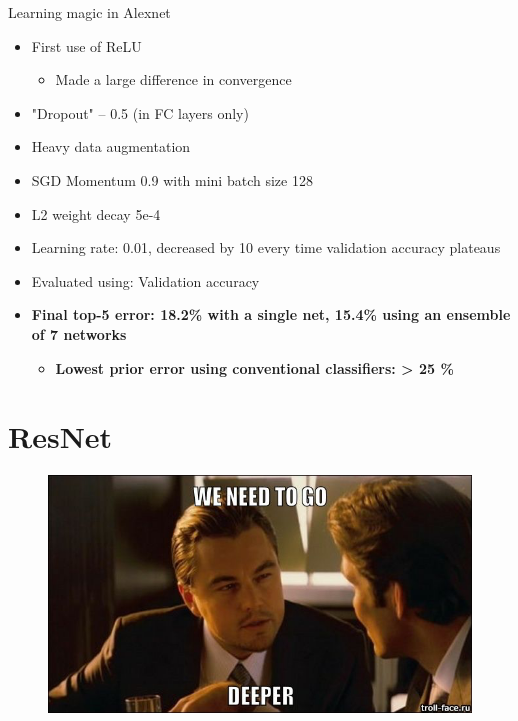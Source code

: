 \documentclass[serif, aspectratio=169]{beamer}
\begin{document}
\begin{frame}{Learning magic in Alexnet}
	\begin{itemize}
		\item First use of ReLU
		\begin{itemize}
			\item Made a large difference in convergence
		\end{itemize}
		\item "Dropout" – 0.5 (in FC layers only)
		\item Heavy data augmentation
		\item SGD Momentum 0.9 with mini batch size 128
		\item L2 weight decay 5e-4
		\item Learning rate: 0.01, decreased by 10 every time validation accuracy plateaus
		\item Evaluated using: Validation accuracy
		\item \textbf{Final top-5 error: 18.2\% with a single net, 15.4\% using an ensemble of 7 networks}
		\begin{itemize}
			\item \textbf{Lowest prior error using conventional classifiers: > 25 \%}
		\end{itemize}
	\end{itemize}
\end{frame}

\section{ResNet}

\begin{frame}
	\begin{figure}[htpb]
		\begin{center}
			\includegraphics[keepaspectratio, scale=0.5]{pic/deeper}
		\end{center}
	\end{figure}
\end{frame}
\end{document}
